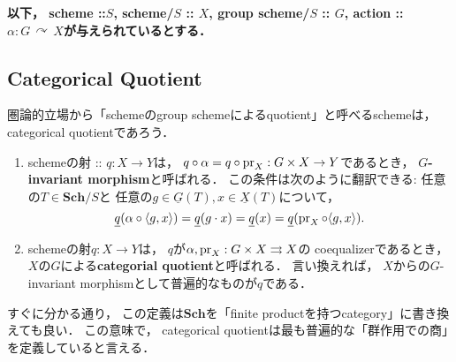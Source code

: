 \documentclass[a4paper]{jsarticle}
\newcommand{\Sch}{\mathbf{Sch}}
\newcommand{\func}[1]{\underline{#1}}
\newcommand{\acton}{\,\curvearrowright\,}
\begin{document}
    \textbf
    {
    以下，
    scheme ::$S$,
    scheme/$S$ :: $X$,
    group scheme/$S$ :: $G$,
    action :: $\alpha: G \acton X$が与えられているとする．
    }

    \subsection{Categorical Quotient}
    圏論的立場から「schemeのgroup schemeによるquotient」と呼べるschemeは，
    categorical quotientであろう．
    \begin{Def}
    \begin{enumerate}[label=(\roman*), leftmargin=*]
        \item
            schemeの射 :: $q: X \to Y$は，
            $q \circ \alpha=q \circ \operatorname{pr}_X: G \times X \to Y$であるとき，
            \textbf{$G$-invariant morphism}と呼ばれる．
            この条件は次のように翻訳できる:
            任意の$T \in \Sch/S$と
            任意の$g \in \func{G}(T), x \in \func{X}(T)$について，
            \[
                \func{q}(\alpha \circ \langle g,x\rangle)
                =\func{q}(g \cdot x)
                =\func{q}(x)
                =\func{q}(\pr_X \circ \langle g,x \rangle).
            \]

        \item
            schemeの射$q: X \to Y$は，
            $q$が$\alpha, \operatorname{pr}_X: G \times X \rightrightarrows X$の
            coequalizerであるとき，
            $X$の$G$による\textbf{categorial quotient}と呼ばれる．
            言い換えれば，
            $X$からの$G$-invariant morphismとして普遍的なものが$q$である．


    \end{enumerate}
    \end{Def}
    すぐに分かる通り，
    この定義は$\Sch$を「finite productを持つcategory」に書き換えても良い．
    この意味で，
    categorical quotientは最も普遍的な「群作用での商」を定義していると言える．
\end{document}
